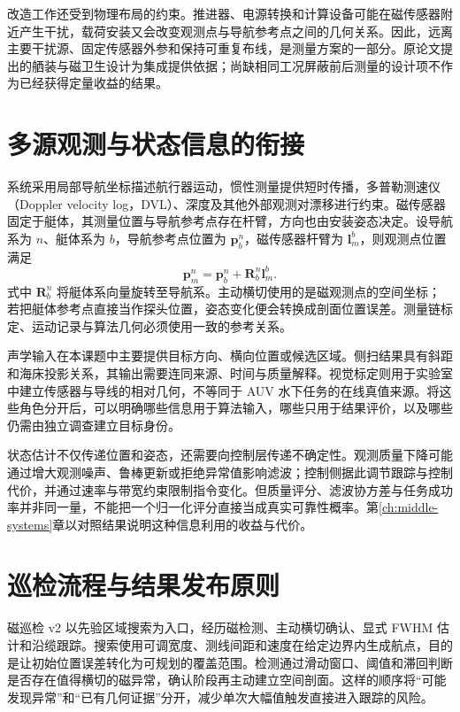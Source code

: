改造工作还受到物理布局的约束。推进器、电源转换和计算设备可能在磁传感器附近产生干扰，载荷安装又会改变观测点与导航参考点之间的几何关系。因此，远离主要干扰源、固定传感器外参和保持可重复布线，是测量方案的一部分。原论文提出的舾装与磁卫生设计为集成提供依据；尚缺相同工况屏蔽前后测量的设计项不作为已经获得定量收益的结果。

\section{多源观测与状态信息的衔接}

系统采用局部导航坐标描述航行器运动，惯性测量提供短时传播，多普勒测速仪（Doppler velocity log，DVL）、深度及其他外部观测对漂移进行约束。磁传感器固定于艇体，其测量位置与导航参考点存在杆臂，方向也由安装姿态决定。设导航系为 $n$、艇体系为 $b$，导航参考点位置为 $\boldsymbol p_b^n$，磁传感器杆臂为 $\boldsymbol l_m^b$，则观测点位置满足
\begin{equation}
  \boldsymbol p_m^n=\boldsymbol p_b^n+\boldsymbol R_b^n\boldsymbol l_m^b.
  \label{eq:middle-lever}
\end{equation}
式中 $\boldsymbol R_b^n$ 将艇体系向量旋转至导航系。主动横切使用的是磁观测点的空间坐标；若把艇体参考点直接当作探头位置，姿态变化便会转换成剖面位置误差。测量链标定、运动记录与算法几何必须使用一致的参考关系。

声学输入在本课题中主要提供目标方向、横向位置或候选区域。侧扫结果具有斜距和海床投影关系，其输出需要连同来源、时间与质量解释。视觉标定则用于实验室中建立传感器与导线的相对几何，不等同于 AUV 水下任务的在线真值来源。将这些角色分开后，可以明确哪些信息用于算法输入，哪些只用于结果评价，以及哪些仍需由独立调查建立目标身份。

状态估计不仅传递位置和姿态，还需要向控制层传递不确定性。观测质量下降可能通过增大观测噪声、鲁棒更新或拒绝异常值影响滤波；控制侧据此调节跟踪与控制代价，并通过速率与带宽约束限制指令变化。但质量评分、滤波协方差与任务成功率并非同一量，不能把一个归一化评分直接当成真实可靠性概率。第\ref{ch:middle-systems}章以对照结果说明这种信息利用的收益与代价。

\section{巡检流程与结果发布原则}

磁巡检 v2 以先验区域搜索为入口，经历磁检测、主动横切确认、显式 FWHM 估计和沿缆跟踪。搜索使用可调宽度、测线间距和速度在给定边界内生成航点，目的是让初始位置误差转化为可规划的覆盖范围。检测通过滑动窗口、阈值和滞回判断是否存在值得横切的磁异常，确认阶段再主动建立空间剖面。这样的顺序将“可能发现异常”和“已有几何证据”分开，减少单次大幅值触发直接进入跟踪的风险。

